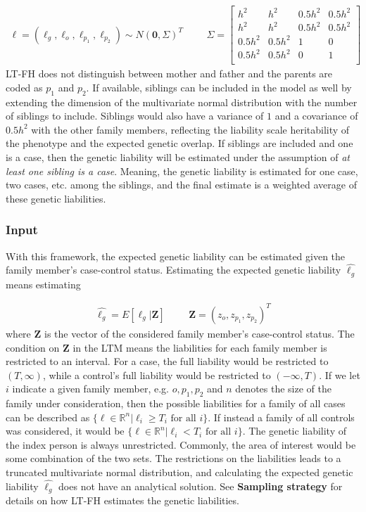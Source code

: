 \begin{align}\label{eq:LTFH_model}
\ell = \left( \ell_g, \ell_o, \ell_{p_1}, \ell_{p_2} \right) \sim N(\mathbf{0}, \Sigma)^T & & &\Sigma = \begin{bmatrix}
h^2	&	h^2	&	0.5h^2	&	0.5h^2	\\
h^2 &	h^2 &	0.5h^2	&	0.5h^2	\\
0.5h^2	&	0.5h^2	&	1	&	0	\\
0.5h^2	&	0.5h^2	&	0	&	1	\\
\end{bmatrix}
\end{align}
LT-FH does not distinguish between mother and father and the parents are coded as $ p_1 $ and $ p_2 $. If available, siblings can be included in the model as well by extending the dimension of the multivariate normal distribution with the number of siblings to include. Siblings would also have a variance of $ 1 $ and a covariance of $ 0.5h^2 $ with the other family members, reflecting the liability scale heritability of the phenotype and the expected genetic overlap. If siblings are included and one is a case, then the genetic liability will be estimated under the assumption of \textit{at least one sibling is a case}. Meaning, the genetic liability is estimated for one case, two cases, etc. among the siblings, and the final estimate is a weighted average of these genetic liabilities.

\subsubsection{Input}

With this framework, the expected genetic liability can be estimated given the family member's case-control status. Estimating the expected genetic liability $ \hat{\ell_g} $ means estimating 

\begin{align*}
\hat{\ell_g} = E\left[ \ell_g | \mathbf{Z} \right] & & & \mathbf{Z} = \left(z_o, z_{p_1}, z_{p_2} \right)^T
\end{align*}
where $ \mathbf{Z} $ is the vector of the considered family member's case-control status. The condition on $ \mathbf{Z} $ in the LTM means the liabilities for each family member is restricted to an interval. For a case, the full liability would be restricted to $ (T, \infty) $, while a control's full liability would be restricted to $ (-\infty, T) $. If we let $ i $ indicate a given family member, e.g. $ o, p_1, p_2 $ and $ n $ denotes the size of the family under consideration, then the possible liabilities for a family of all cases can be described as $ \{ \ell \in \mathbb{R}^n | \ell_i \geq T_i \text{ for all } i\} $. If instead a family of all controls was considered, it would be $ \{ \ell \in \mathbb{R}^n | \ell_i < T_i \text{ for all } i\} $. The genetic liability of the index person is always unrestricted. Commonly, the area of interest would be some combination of the two sets. The restrictions on the liabilities leads to a truncated multivariate normal distribution, and calculating the expected genetic liability $ \hat{\ell_g} $ does not have an analytical solution. See \textbf{Sampling strategy} for details on how LT-FH estimates the genetic liabilities. 

